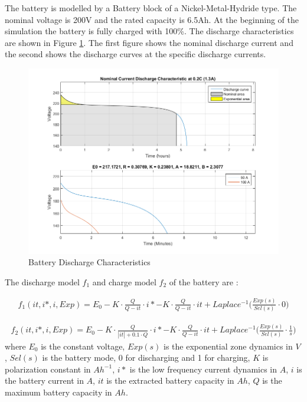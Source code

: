 The battery is modelled by a Battery block of a Nickel-Metal-Hydride type. The nominal voltage is 200V and the rated capacity is 6.5Ah. At the beginning of the simulation the battery is fully charged with 100\%. The discharge characteristics are shown in Figure \ref{fig:batteryDischarge}. The first figure shows the nominal discharge current and the second shows the discharge curves at the specific discharge currents. 

\begin{figure}[h]
\centering
\includegraphics[scale=0.42]{figures/battery}
\caption{Battery Discharge Characteristics}
\label{fig:batteryDischarge}
\end{figure}

The discharge model $f_1$ and charge model $f_2$ of the battery are \citep{batteryMatlab}:

\begin{equation}
\begin{split}
f_1(it,i*,i,Exp) = E_0 - K \cdot \frac{Q}{Q-it} \cdot i* - K \cdot \frac{Q}{Q-it} \cdot it + Laplace^{-1} \bigg( \frac{Exp(s)}{Sel(s)} \cdot 0 \bigg)
\end{split}
\end{equation}

\begin{equation}
\begin{split}
f_2(it,i*,i,Exp) = E_0 - K \cdot \frac{Q}{|it|+0.1 \cdot Q} \cdot i* - K \cdot \frac{Q}{Q-it} \cdot it + Laplace^{-1} \bigg( \frac{Exp(s)}{Sel(s)} \cdot \frac{1}{s} \bigg)
\end{split}
\end{equation}
where $E_0$ is the constant voltage, $Exp(s)$ is the exponential zone dynamics in $V$, $Sel(s)$ is the battery mode, 0 for discharging and 1 for charging, $K$ is polarization constant in $Ah^{-1}$, $i*$ is the low frequency current dynamics in $A$, $i$ is the battery current in $A$, $it$ is the extracted battery capacity in $Ah$, $Q$ is the maximum battery capacity in $Ah$.

